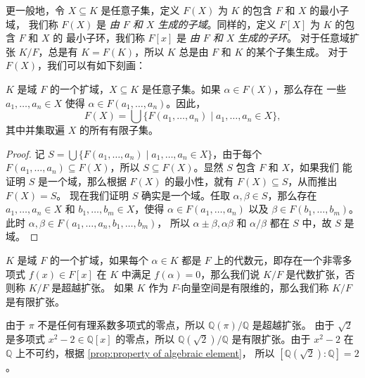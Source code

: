 更一般地，令 $X\subseteq K$ 是任意子集，定义 $F(X)$ 为 $K$ 的包含 $F$ 和 $X$ 的最小子域，
我们称 $F(X)$ 是 \emph{由 $F$ 和 $X$ 生成的子域}。同样的，定义 $F[X]$ 为 $K$ 的包含 $F$ 和 $X$ 的
最小子环，我们称 $F[x]$ 是 \emph{由 $F$ 和 $X$ 生成的子环}。
对于任意域扩张 $K/F$，总是有 $K=F(K)$，所以 $K$ 总是由 $F$ 和 $K$ 的某个子集生成。
对于 $F(X)$，我们可以有如下刻画：
\begin{proposition}\label{prop:generated by set}
  $K$ 是域 $F$ 的一个扩域，$X\subseteq K$ 是任意子集。如果 $\alpha\in F(X)$，那么存在
  一些 $a_1,\dots,a_n\in X$ 使得 $\alpha\in F(a_1,\dots,a_n)$。因此，
  \[
    F(X)=\bigcup \bigl\{F(a_1,\dots,a_n)\mid a_1,\dots,a_n\in X\bigr\}  ,
  \]
  其中并集取遍 $X$ 的所有有限子集。
\end{proposition}
\begin{proof}
  记 $S=\bigcup \bigl\{F(a_1,\dots,a_n)\mid a_1,\dots,a_n\in X\bigr\}$，由于每个
  $F(a_1,\dots,a_n)\subseteq F(X)$，所以 $S\subseteq F(X)$。显然 $S$ 包含 $F$ 和 $X$，如果我们
  能证明 $S$ 是一个域，那么根据 $F(X)$ 的最小性，就有 $F(X)\subseteq S$，从而推出 $F(X)=S$。
  现在我们证明 $S$ 确实是一个域。任取 $\alpha,\beta\in S$，那么存在
  $a_1,\dots,a_n\in X$ 和 $b_1,\dots,b_m\in X$，使得 $\alpha\in F(a_1,\dots,a_n)$ 以及 
  $\beta\in F(b_1,\dots,b_m)$。此时 $\alpha,\beta\in F(a_1,\dots,a_n,b_1,\dots,b_m)$，
  所以 $\alpha\pm \beta,\alpha\beta$ 和 $\alpha/\beta$ 都在 $S$ 中，故 $S$
  是域。
\end{proof}

\begin{definition}
  $K$ 是域 $F$ 的一个扩域，如果每个 $\alpha\in K$ 都是 $F$ 上的代数元，即存在一个非零多项式
  $f(x)\in F[x]$ 在 $K$ 中满足 $f(\alpha)=0$，那么我们说 $K/F$ 是代数扩张，否则称
  $K/F$ 是超越扩张。
  如果 $K$ 作为 $F$-向量空间是有限维的，那么我们称 $K/F$ 是有限扩张。
\end{definition}

由于 $\pi$ 不是任何有理系数多项式的零点，所以 $\mathbb{Q}(\pi)/\mathbb{Q}$ 是超越扩张。
由于 $\sqrt{2}$ 是多项式 $x^2-2\in\mathbb{Q}[x]$ 的零点，所以 $\mathbb{Q}(\sqrt{2})/\mathbb{Q}$
是有限扩张。由于 $x^2-2$ 在 $\mathbb{Q}$ 上不可约，根据 \autoref{prop:property of algebraic element}，
所以 $[\mathbb{Q}(\sqrt{2}):\mathbb{Q}]=2$。

